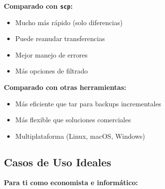 \documentclass[
  doc,
  floatsintext,
  longtable,
  a4paper,
  nolmodern,
  notxfonts,
  notimes,
  12pt,
  colorlinks=true,linkcolor=blue,citecolor=blue,urlcolor=blue]{apa7}
\providecommand{\tightlist}{%
  \setlength{\itemsep}{0pt}\setlength{\parskip}{0pt}}
\begin{document}
\textbf{Comparado con \texttt{scp}:}

\begin{itemize}
\tightlist
\item
  Mucho más rápido (solo diferencias)
\item
  Puede reanudar transferencias
\item
  Mejor manejo de errores
\item
  Más opciones de filtrado
\end{itemize}

\textbf{Comparado con otras herramientas:}

\begin{itemize}
\tightlist
\item
  Más eficiente que tar para backups incrementales
\item
  Más flexible que soluciones comerciales
\item
  Multiplataforma (Linux, macOS, Windows)
\end{itemize}

\subsection{Casos de Uso Ideales}\label{casos-de-uso-ideales}

\textbf{Para ti como economista e informático:}
\end{document}
